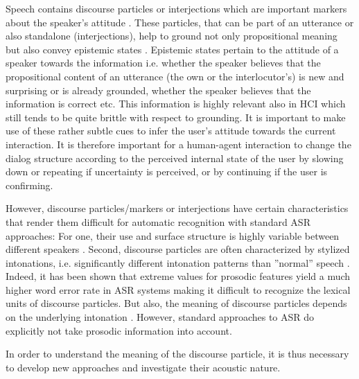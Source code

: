 \documentclass[letterpaper]{article}
\begin{document}
Speech contains discourse particles or interjections which are important markers about the speaker's attitude \cite{Anderson2000}. 
These particles, that can be part of an utterance or also standalone (interjections), help to ground not only propositional meaning but also convey epistemic states \cite{Fischer2007}. 
Epistemic states pertain to the attitude of a speaker towards the information i.e. whether the speaker believes that the propositional content of an utterance (the own or the interlocutor's) is new and surprising or is already grounded, whether the speaker believes that the information is correct etc.
This information is highly relevant also in HCI which still tends to be quite brittle with respect to grounding. It is important to make use of these rather subtle cues to infer the user's attitude towards the current interaction. 
It is therefore important for a human-agent interaction to change the dialog structure according to the perceived internal state of the user by slowing down or repeating if uncertainty is perceived, or by continuing if the user is confirming.

However, discourse particles/markers or interjections have certain characteristics that render them difficult for automatic recognition with standard ASR approaches: 
For one, their use and surface structure is highly variable between different speakers \cite{Bell2001}.
Second, discourse particles are often characterized by stylized intonations, i.e. significantly different intonation patterns than ''normal'' speech \cite{Gibbon1997}.
Indeed, it has been shown that extreme values for prosodic features yield a much higher word error rate in ASR systems \cite{Jurafsky2010}
making it difficult to recognize the lexical units of discourse particles. But also, the meaning of discourse particles depends on the underlying intonation \cite{Gibbon1997}.
However, standard approaches to ASR do explicitly not take prosodic information into account.

In order to understand the meaning of the discourse particle, it is thus necessary to develop new approaches and investigate their acoustic nature.
\end{document}
